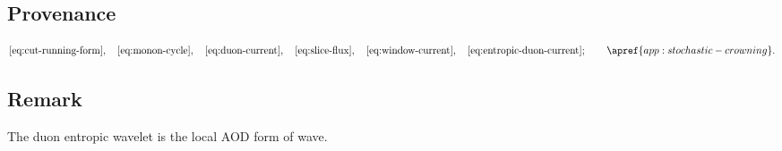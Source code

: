 \subsection{Provenance}
\label{app:wave:provenance}
\[
\eqref{eq:cut-running-form},
\quad
\eqref{eq:monon-cycle},
\quad
\eqref{eq:duon-current},
\quad
\eqref{eq:slice-flux},
\quad
\eqref{eq:window-current},
\quad
\eqref{eq:entropic-duon-current};
\qquad
\apref{app:stochastic-crowning}.
\]

\subsection{Remark}
\label{app:wave:remark}
The duon entropic wavelet is the local AOD form of wave.
